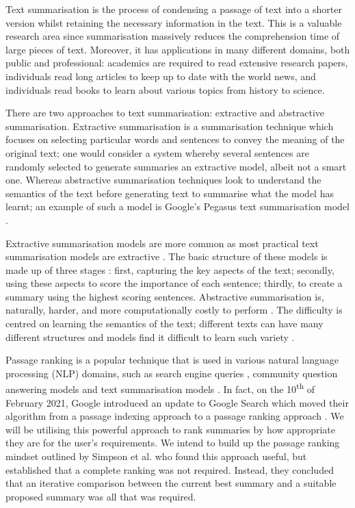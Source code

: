 Text summarisation is the process of condensing a passage of text into a shorter version whilst retaining the necessary information in the text. This is a valuable research area since summarisation massively reduces the comprehension time of large pieces of text. Moreover, it has applications in many different domains, both public and professional: academics are required to read extensive research papers, individuals read long articles to keep up to date with the world news, and individuals read books to learn about various topics from history to science.

\medbreak
There are two approaches to text summarisation: extractive and abstractive summarisation. Extractive summarisation is a summarisation technique which focuses on selecting particular words and sentences to convey the meaning of the original text; one would consider a system whereby several sentences are randomly selected to generate summaries an extractive model, albeit not a smart one. Whereas abstractive summarisation techniques look to understand the semantics of the text before generating text to summarise what the model has learnt; an example of such a model is Google's Pegasus text summarisation model \cite{Zhao19}.

\medbreak
Extractive summarisation models are more common as most practical text summarisation models are extractive \cite{Gudivada15}. The basic structure of these models is made up of three stages \cite{Nenkova11}: first, capturing the key aspects of the text; secondly, using these aspects to score the importance of each sentence; thirdly, to create a summary using the highest scoring sentences. Abstractive summarisation is, naturally, harder, and more computationally costly to perform \cite{Gudivada15}. The difficulty is centred on learning the semantics of the text; different texts can have many different structures and models find it difficult to learn such variety \cite{Zhu21}.
		
\medbreak
Passage ranking is a popular technique that is used in various natural language processing (NLP) domains, such as search engine queries \cite{Chang20}, community question answering models \cite{Lin17} and text summarisation models \cite{Simpson19}. In fact, on the 10\textsuperscript{th} of February 2021, Google introduced an update to Google Search which moved their algorithm from a passage indexing approach to a passage ranking approach \cite{Seround21}. We will be utilising this powerful approach to rank summaries by how appropriate they are for the user's requirements. We intend to build up the passage ranking mindset outlined by Simpson et al. \cite{Simpson19} who found this approach useful, but established that a complete ranking was not required. Instead, they concluded that an iterative comparison between the current best summary and a suitable proposed summary was all that was required.

